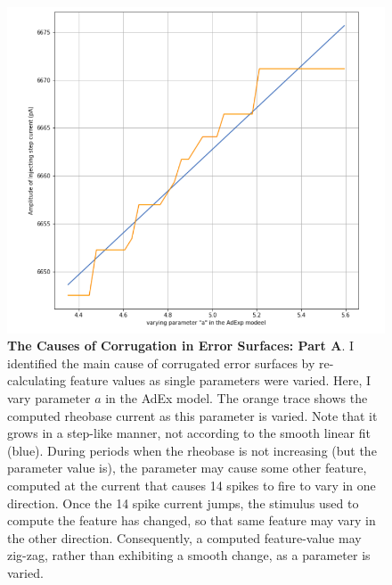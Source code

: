 \begin{figure}
\begin{center}
\includegraphics[]{figures/fundamental_cause_of_corrogations.png}
\caption[Causes of corrugation (1)]{\textbf{The Causes of Corrugation in Error Surfaces: Part A}.
I identified the main cause of corrugated error surfaces by re-calculating feature values as single parameters were varied.
Here, I vary parameter $a$ in the AdEx model.
The orange trace shows the computed rheobase current as this parameter is varied.
Note that it grows in a step-like manner, not according to the smooth linear fit (blue).
During periods when the rheobase is not increasing (but the parameter value is), the parameter may cause some other feature, computed at the current that causes 14 spikes to fire to vary in one direction.
Once the 14 spike current jumps, the stimulus used to compute the feature has changed, so that same feature may vary in the other direction.
Consequently, a computed feature-value may zig-zag, rather than exhibiting a smooth change, as a parameter is varied.}
\label{fig:corrugation-cause-1}
\end{center}
\end{figure}

